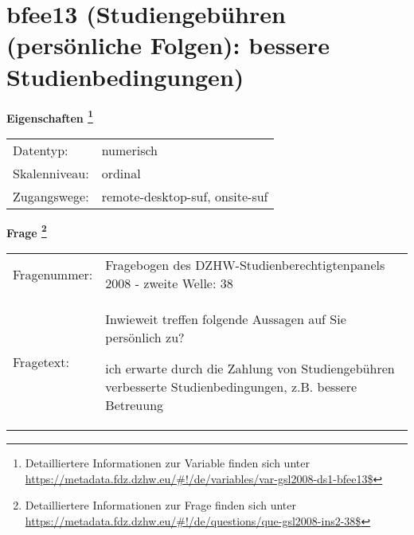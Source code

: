 
    \setcounter{footnote}{0}

    \vspace*{-1.8cm}
	\section{bfee13 (Studiengebühren (persönliche Folgen): bessere Studienbedingungen)}
	\label{section:bfee13}



    \vspace*{0.5cm}
    \noindent\textbf{Eigenschaften
	\footnote{Detailliertere Informationen zur Variable finden sich unter
		\url{https://metadata.fdz.dzhw.eu/\#!/de/variables/var-gsl2008-ds1-bfee13$}}}\\
	\begin{tabularx}{\hsize}{@{}lX}
	Datentyp: & numerisch \\
	Skalenniveau: & ordinal \\
	Zugangswege: &
	  remote-desktop-suf, 
	  onsite-suf
 \\
    \end{tabularx}



				\vspace*{0.5cm}
                \noindent\textbf{Frage
	                \footnote{Detailliertere Informationen zur Frage finden sich unter
		              \url{https://metadata.fdz.dzhw.eu/\#!/de/questions/que-gsl2008-ins2-38$}}}\\
				\begin{tabularx}{\hsize}{@{}lX}
					Fragenummer: &
					  Fragebogen des DZHW-Studienberechtigtenpanels 2008 - zweite Welle:
					  38
 \\
					Fragetext: & Inwieweit treffen folgende Aussagen auf Sie persönlich zu?\par  ich erwarte durch die Zahlung von Studiengebühren verbesserte Studienbedingungen, z.B. bessere Betreuung \\
				\end{tabularx}





